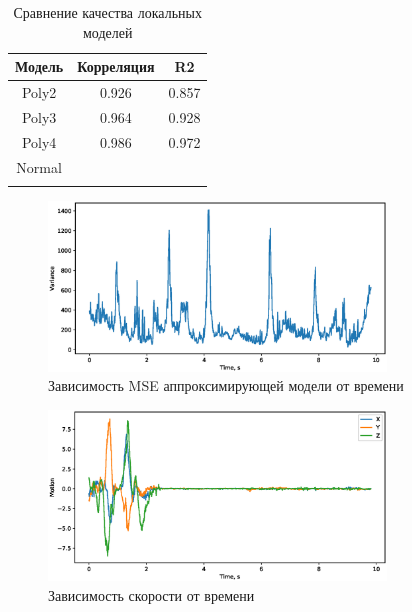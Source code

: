 \documentclass[12pt, twoside]{article}
\begin{document}
\begin{table}[h]
	\centering
	\begin{tabular}{|c|c|c|}
		\hline
		Модель & Корреляция & R2 \\ \hline
		Poly2&0.926      &0.857\\ \hline
		Poly3&0.964       & 0.928   \\ \hline
		Poly4& 0.986  & 0.972   \\ \hline
		Normal& & \\ \hline
		&  &    \\ \hline
	\end{tabular}
	\caption{Сравнение качества локальных моделей}
\end{table}

\begin{figure}[h]
	\centering
	\includegraphics[width=0.8\textwidth]{../figs/variance.eps}
	\caption{Зависимость MSE аппроксимирующей модели от времени}
\end{figure}

\begin{figure}[h]
	\centering
	\includegraphics[width=0.8\textwidth]{../figs/motion.eps}
	\caption{Зависимость скорости от времени}
\end{figure}
\FloatBarrier
\end{document}
